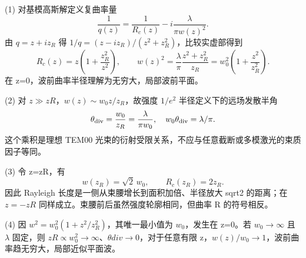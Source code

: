 (1) 对基模高斯解定义复曲率量
\[
\frac1{q(z)}=\frac1{R_c(z)}-i\frac{\lambda}{\pi w(z)^2}.
\]
由 \(q=z+iz_R\) 得 \(1/q=(z-iz_R)/(z^2+z_R^2)\)，比较实虚部得到
\[
R_c(z)=z\left(1+\frac{z_R^2}{z^2}\right),\qquad
w(z)^2=\frac{\lambda}{\pi}\frac{z^2+z_R^2}{z_R}
=w_0^2\left(1+\frac{z^2}{z_R^2}\right).
\]
在 z=0，波前曲率半径理解为无穷大，局部波前平面。

(2) 对 \(z\gg zR\)，\(w(z)\sim w_0z/z_R\)，故强度 \(1/e^{2}\) 半径定义下的远场发散半角
\[
\theta_{\rm div}=\frac{w_0}{z_R}=\frac{\lambda}{\pi w_0},
\quad w_0\theta_{\rm div}=\lambda/\pi.
\]
这个乘积是理想 TEM00 光束的衍射受限关系，不应与任意截断或多模激光的束质因子等同。

(3) 令 z=zR，有
\[
w(z_R)=\sqrt2\,w_0,\qquad R_c(z_R)=2z_R.
\]
因此 Rayleigh 长度是一侧从束腰增长到面积加倍、半径放大 sqrt2 的距离；在 \(z=-zR\) 同样成立。束腰前后虽然强度轮廓相同，但曲率 R 的符号相反。

(4) 因 \(w^2=w_0^2(1+z^2/z_R^2)\)，其唯一最小值为 \(w_{0}\)，发生在 z=0。若 \(w_{0}\to \infty \) 且 \(\lambda \) 固定，则 \(zR\propto w_{0}^{2}\to \infty \)、\(\theta div\to 0\)，对于任意有限 z，\(w(z)/w_0\to1\)，波前曲率趋无穷大，局部近似平面波。

